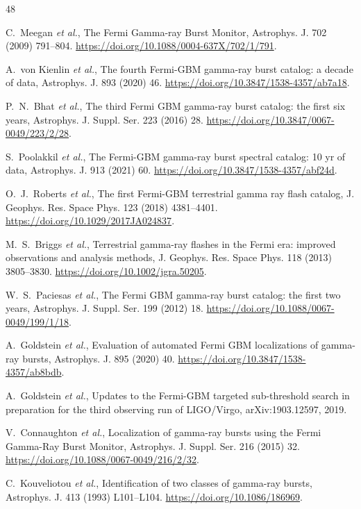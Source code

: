 \documentclass{ieeeaccess}
\begin{document}
\begin{thebibliography}{48}

 C.~Meegan \textit{et al.}, The Fermi Gamma-ray Burst Monitor, Astrophys. J. 702 (2009) 791--804. \url{https://doi.org/10.1088/0004-637X/702/1/791}.

 A.~von Kienlin \textit{et al.}, The fourth Fermi-GBM gamma-ray burst catalog: a decade of data, Astrophys. J. 893 (2020) 46. \url{https://doi.org/10.3847/1538-4357/ab7a18}.

 P.~N.~Bhat \textit{et al.}, The third Fermi GBM gamma-ray burst catalog: the first six years, Astrophys. J. Suppl. Ser. 223 (2016) 28. \url{https://doi.org/10.3847/0067-0049/223/2/28}.

 S.~Poolakkil \textit{et al.}, The Fermi-GBM gamma-ray burst spectral catalog: 10 yr of data, Astrophys. J. 913 (2021) 60. \url{https://doi.org/10.3847/1538-4357/abf24d}.

 O.~J.~Roberts \textit{et al.}, The first Fermi-GBM terrestrial gamma ray flash catalog, J. Geophys. Res. Space Phys. 123 (2018) 4381--4401. \url{https://doi.org/10.1029/2017JA024837}.

 M.~S.~Briggs \textit{et al.}, Terrestrial gamma-ray flashes in the Fermi era: improved observations and analysis methods, J. Geophys. Res. Space Phys. 118 (2013) 3805--3830. \url{https://doi.org/10.1002/jgra.50205}.

 W.~S.~Paciesas \textit{et al.}, The Fermi GBM gamma-ray burst catalog: the first two years, Astrophys. J. Suppl. Ser. 199 (2012) 18. \url{https://doi.org/10.1088/0067-0049/199/1/18}.

 A.~Goldstein \textit{et al.}, Evaluation of automated Fermi GBM localizations of gamma-ray bursts, Astrophys. J. 895 (2020) 40. \url{https://doi.org/10.3847/1538-4357/ab8bdb}.

 A.~Goldstein \textit{et al.}, Updates to the Fermi-GBM targeted sub-threshold search in preparation for the third observing run of LIGO/Virgo, arXiv:1903.12597, 2019.

 V.~Connaughton \textit{et al.}, Localization of gamma-ray bursts using the Fermi Gamma-Ray Burst Monitor, Astrophys. J. Suppl. Ser. 216 (2015) 32. \url{https://doi.org/10.1088/0067-0049/216/2/32}.

 C.~Kouveliotou \textit{et al.}, Identification of two classes of gamma-ray bursts, Astrophys. J. 413 (1993) L101--L104. \url{https://doi.org/10.1086/186969}.


\end{thebibliography}
\end{document}
